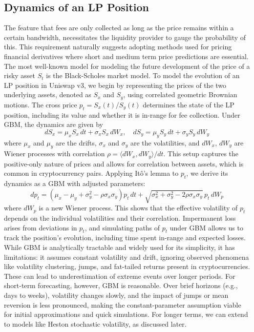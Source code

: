 \documentclass{article}
\begin{document}
\subsection{Dynamics of an LP Position}
The feature that fees are only collected as long as the price remains within a certain bandwidth, necessitates the liquidity provider to gauge the probability of this. This requirement naturally suggests adopting methods used for pricing financial derivatives where short and medium term price predictions are essential. The most well-known model for modeling the future development of the price of a risky asset $S_t$ is the Black-Scholes market model.
To model the evolution of an LP position in Uniswap v3, we begin by representing the prices of the two underlying assets, denoted as $S_x$ and $S_y$, using correlated geometric Brownian motions. The cross price $p_t = S_x(t) / S_y(t)$ determines the state of the LP position, including its value and whether it is in-range for fee collection.
Under GBM, the dynamics are given by
\begin{equation}
   dS_x = \mu_x S_x \, dt + \sigma_x S_x \, dW_x, \quad dS_y = \mu_y S_y \, dt + \sigma_y S_y \, dW_y 
\end{equation}
where $\mu_x$ and $\mu_y$ are the drifts, $\sigma_x$ and $\sigma_y$ are the volatilities, and $dW_x$, $dW_y$ are Wiener processes with correlation $\rho = \langle dW_x, dW_y \rangle / dt$. This setup captures the positive-only nature of prices and allows for correlation between assets, which is common in cryptocurrency pairs.
Applying Itô's lemma to $p_t$, we derive its dynamics as a GBM with adjusted parameters:
\begin{equation}
   dp_t = (\mu_x - \mu_y + \sigma_y^2 - \rho \sigma_x \sigma_y) p_t \, dt + \sqrt{\sigma_x^2 + \sigma_y^2 - 2 \rho \sigma_x \sigma_y} \, p_t \, dW_p 
\end{equation}
where $dW_p$ is a new Wiener process. This shows that the effective volatility of $p_t$ depends on the individual volatilities and their correlation.
Impermanent loss arises from deviations in $p_t$, and simulating paths of $p_t$ under GBM allows us to track the position's evolution, including time spent in-range and expected losses.
While GBM is analytically tractable and widely used for its simplicity, it has limitations: it assumes constant volatility and drift, ignoring  observed phenomena like volatility clustering, jumps, and fat-tailed returns present in cryptocurrencies. These can lead to underestimation of extreme events over longer periods.
For short-term forecasting, however, GBM is reasonable. Over brief horizons (e.g., days to weeks), volatility changes slowly, and the impact of jumps or mean reversion is less pronounced, making the constant-parameter assumption viable for initial approximations and quick simulations. For longer terms, we can extend to models like Heston stochastic volatility, as discussed later.
\end{document}
